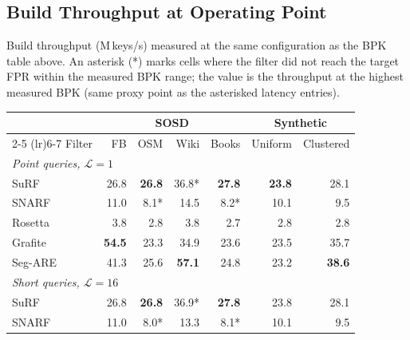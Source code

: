 
\subsection{Build Throughput at Operating Point}
\label{subsec:eval-throughput}

Build throughput (M\,keys/s) measured at the same configuration as the BPK table above.
An asterisk (*) marks cells where the filter did not reach the target FPR
within the measured BPK range; the value is the throughput at the highest
measured BPK (same proxy point as the asterisked latency entries).

\begin{table}[H]
    \centering
    \small
    \begin{tabular}{@{}lrrrrrr@{}}
        \toprule
        & \multicolumn{4}{c}{SOSD} & \multicolumn{2}{c}{Synthetic} \\
        \cmidrule(lr){2-5} \cmidrule(lr){6-7}
        Filter  & FB            & OSM              & Wiki             & Books            & Uniform          & Clustered        \\
        \midrule
        \multicolumn{7}{l}{\textit{Point queries, $\mathcal{L} = 1$}} \\
        \midrule
        SuRF    & 26.8          & \textbf{26.8}    & 36.8*            & \textbf{27.8}    & \textbf{23.8}    & 28.1             \\
        SNARF   & 11.0          & 8.1*             & 14.5             & 8.2*             & 10.1             & 9.5              \\
        Rosetta & 3.8           & 2.8              & 3.8              & 2.7              & 2.8              & 2.8              \\
        Grafite & \textbf{54.5} & 23.3             & 34.9             & 23.6             & 23.5             & 35.7             \\
        Seg-ARE & 41.3          & 25.6             & \textbf{57.1}    & 24.8             & 23.2             & \textbf{38.6}    \\
        \midrule
        \multicolumn{7}{l}{\textit{Short queries, $\mathcal{L} = 16$}} \\
        \midrule
        SuRF    & 26.8          & \textbf{26.8}    & 36.9*            & \textbf{27.8}    & 23.8             & 28.1             \\
        SNARF   & 11.0          & 8.0*             & 13.3             & 8.1*             & 10.1             & 9.5              \\

\end{tabular}
\end{table}
